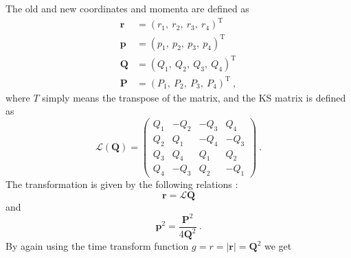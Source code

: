 \documentclass[english, oneside]{HYgradu}
\begin{document}
The old and new coordinates and momenta are defined as
\begin{equation}
\begin{aligned}
\mathbf{r} &= (r_1, \ r_2, \ r_3, \ r_4)^\mathrm{T} \\
\mathbf{p} &= (p_1, \ p_2, \ p_3, \ p_4)^\mathrm{T} \\
\mathbf{Q} &= (Q_1, \ Q_2, \ Q_3, \ Q_4)^\mathrm{T} \\
\mathbf{P} &= (P_1, \ P_2, \ P_3, \ P_4)^\mathrm{T} \ ,
\end{aligned}
\end{equation}
where $T$ simply means the transpose of the matrix, and the KS matrix is defined as 
\begin{equation}
\mathcal{L}(\mathbf{Q}) =
\begin{pmatrix}
Q_1 & -Q_2 & -Q_3 & Q_4 \\
Q_2 & Q_1 & -Q_4 & -Q_3 \\
Q_3 & Q_4 & Q_1 & Q_2 \\
Q_4 & -Q_3 & Q_2 & -Q_1
\end{pmatrix} \ .
\end{equation}
The transformation is given by the following relations \citep{ad}: 
\begin{equation}
\mathbf{r} = \mathcal{L} \mathbf{Q} \label{equ:KStransform}
\end{equation}
and
\begin{equation}
\mathbf{p}^2 = \frac{\mathbf{P}^2}{4 \mathbf{Q}^2} \ .
\end{equation}
By again using the time transform function $g = r = \left| \mathbf{r} \right| = \mathbf{Q}^2$ we get
\end{document}
